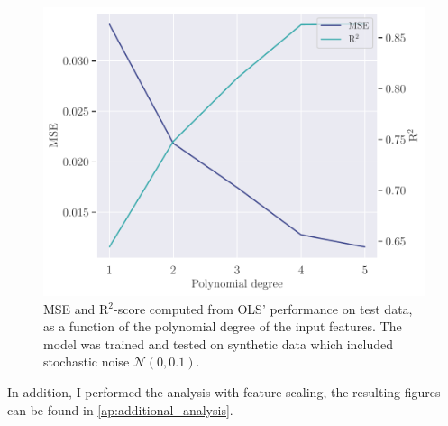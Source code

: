 \begin{figure}[h]
    \centering
    \includegraphics[width=\linewidth]{project-1/latex/figures/ols_error_N50.pdf}
    \caption{MSE and R$^{2}$-score computed from OLS' performance on test data, as a function of the polynomial degree of the input features. The model was trained and tested on synthetic data which included stochastic noise $\mathcal{N}(0, 0.1)$.}
    \label{fig:ols_error}
\end{figure}
In addition, I performed the analysis with feature scaling, the resulting figures can be found in \ref{ap:additional_analysis}.


